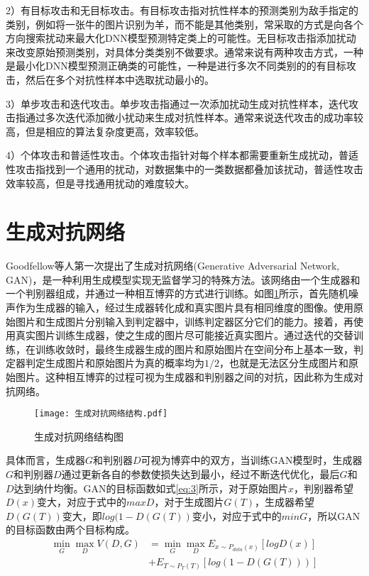 2）有目标攻击和无目标攻击。有目标攻击指对抗性样本的预测类别为敌手指定的类别，例如将一张牛的图片识别为羊，而不能是其他类别，常采取的方式是向各个方向搜索扰动来最大化DNN模型预测特定类上的可能性。无目标攻击指添加扰动来改变原始预测类别，对具体分类类别不做要求。通常来说有两种攻击方式，一种是最小化DNN模型预测正确类的可能性，一种是进行多次不同类别的的有目标攻击，然后在多个对抗性样本中选取扰动最小的。
	
3）单步攻击和迭代攻击。单步攻击指通过一次添加扰动生成对抗性样本，迭代攻击指通过多次迭代添加微小扰动来生成对抗性样本。通常来说迭代攻击的成功率较高，但是相应的算法复杂度更高，效率较低。
	
4）个体攻击和普适性攻击。个体攻击指针对每个样本都需要重新生成扰动，普适性攻击指找到一个通用的扰动，对数据集中的一类数据都叠加该扰动，普适性攻击效率较高，但是寻找通用扰动的难度较大。

\section{生成对抗网络}\label{2.3}

Goodfellow等人\cite{goodfellow2014generative}第一次提出了生成对抗网络(Generative Adversarial Network, GAN)，是一种利用生成模型实现无监督学习的特殊方法。该网络由一个生成器和一个判别器组成，并通过一种相互博弈的方式进行训练。如图\ref{生成对抗网络结构图}所示，首先随机噪声作为生成器的输入，经过生成器转化成和真实图片具有相同维度的图像。使用原始图片和生成图片分别输入到判定器中，训练判定器区分它们的能力。接着，再使用真实图片训练生成器，使之生成的图片尽可能接近真实图片。通过迭代的交替训练，在训练收敛时，最终生成器生成的图片和原始图片在空间分布上基本一致，判定器判定生成图片和原始图片为真的概率均为$1/2$，也就是无法区分生成图片和原始图片。这种相互博弈的过程可视为生成器和判别器之间的对抗，因此称为生成对抗网络。

\begin{figure}[htbp]%
	\centering
	\setlength{\abovecaptionskip}{3mm} %
	\setlength{\belowcaptionskip}{-3mm} %
	\texttt{[image: 生成对抗网络结构.pdf]}
	\caption{生成对抗网络结构图}
	\label{生成对抗网络结构图}
	\end {figure}

具体而言，生成器$G$和判别器$D$可视为博弈中的双方，当训练GAN模型时，生成器$G$和判别器$D$通过更新各自的参数使损失达到最小，经过不断迭代优化，最后$G$和$D$达到纳什均衡。GAN的目标函数如式\ref{eq:3}所示，对于原始图片$x$，判别器希望$D(x)$变大，对应于式中的$maxD$，对于生成图片$G(T)$，生成器希望$D(G(T))$变大，即$log(1 - D(G(T))$变小，对应于式中的$minG$，所以GAN的目标函数由两个目标构成。
\begin{equation}
	\label{eq:3}
	\begin{split}
		\mathop{min} \limits_{G} \mathop{max} \limits_{D} V(D, G) &= \mathop{min} \limits_{G} \mathop{max} \limits_{D} E_{x \sim P_{data}(x)}[logD(x)] \\
		&+ E_{T \sim P_{T}(T)}[log(1 - D(G(T)))]
	\end{split}
\end{equation}


